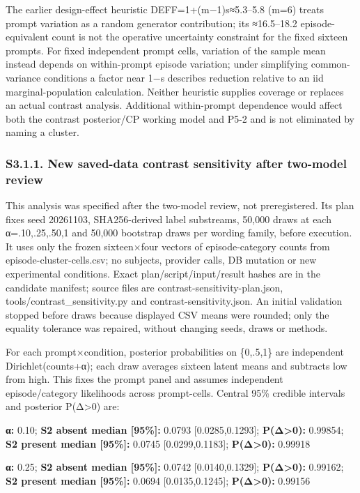 \documentclass[11pt]{article}
\begin{document}
The earlier design-effect heuristic DEFF=1+(m−1)s≈5.3--5.8 (m=6) treats
prompt variation as a random generator contribution; its ≈16.5--18.2
episode-equivalent count is not the operative uncertainty constraint for
the fixed sixteen prompts. For fixed independent prompt cells, variation
of the sample mean instead depends on within-prompt episode variation;
under simplifying common-variance conditions a factor near 1−s describes
reduction relative to an iid marginal-population calculation. Neither
heuristic supplies coverage or replaces an actual contrast analysis.
Additional within-prompt dependence would affect both the contrast
posterior/CP working model and P5-2 and is not eliminated by naming a
cluster.

\subsubsection{S3.1.1. New saved-data contrast sensitivity after
two-model
review}\label{s3.1.1.-new-saved-data-contrast-sensitivity-after-two-model-review}

This analysis was specified after the two-model review, not
preregistered. Its plan fixes seed 20261103, SHA256-derived label
substreams, 50,000 draws at each α=.10,.25,.50,1 and 50,000 bootstrap
draws per wording family, before execution. It uses only the frozen
sixteen×four vectors of episode-category counts from
episode-cluster-cells.csv; no subjects, provider calls, DB mutation or
new experimental conditions. Exact plan/script/input/result hashes are
in the candidate manifest; source files are
contrast-sensitivity-plan.json, tools/contrast\_sensitivity.py and
contrast-sensitivity.json. An initial validation stopped before draws
because displayed CSV means were rounded; only the equality tolerance
was repaired, without changing seeds, draws or methods.

For each prompt×condition, posterior probabilities on \{0,.5,1\} are
independent Dirichlet(counts+α); each draw averages sixteen latent means
and subtracts low from high. This fixes the prompt panel and assumes
independent episode/category likelihoods across prompt-cells. Central
95\% credible intervals and posterior P(Δ\textgreater0) are:

\textbf{α:} 0.10; \textbf{S2 absent median {[}95\%{]}:} 0.0793
{[}0.0285,0.1293{]}; \textbf{P(Δ\textgreater0):} 0.99854; \textbf{S2
present median {[}95\%{]}:} 0.0745 {[}0.0299,0.1183{]};
\textbf{P(Δ\textgreater0):} 0.99918

\textbf{α:} 0.25; \textbf{S2 absent median {[}95\%{]}:} 0.0742
{[}0.0140,0.1329{]}; \textbf{P(Δ\textgreater0):} 0.99162; \textbf{S2
present median {[}95\%{]}:} 0.0694 {[}0.0135,0.1245{]};
\textbf{P(Δ\textgreater0):} 0.99156
\end{document}
